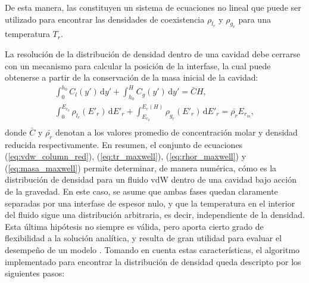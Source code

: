 De esta manera, las  constituyen un sistema de ecuaciones no lineal que puede ser utilizado para encontrar las densidades de coexistencia $\rho_{l_r}$ y $\rho_{g_r}$ para una temperatura $T_r$.

La resoluci\'on de la distribuci\'on de densidad dentro de una cavidad debe cerrarse con un mecanismo para calcular la posici\'on de la interfase, la cual puede obtenerse a partir de la conservaci\'on de la masa inicial de la cavidad:
\begin{equation}
	\begin{gathered}
		\int_{0}^{h_0} C_l(y') \, \mbox{d}y' + \int_{h_0}^{H} C_g(y') \, \mbox{d}y' = \bar{C}H ,\\[3mm]
		\int_{0}^{E_{r_0}} \rho_{l_r} (E'_r) \, \mbox{d}E'_r + \int_{E_{r_0}}^{E_r(H)} \rho_{g_r}(E'_r) \, \mbox{d}E'_r = \bar{\rho_r}E_{r_m}, \\
	\end{gathered}
	\label{eq:masa_maxwell}
\end{equation}
donde $\bar{C}$ y $\bar{\rho_r}$ denotan a los valores promedio de concentraci\'on molar y densidad reducida respectivamente. En resumen, el conjunto de ecuaciones (\ref{eq:vdw_column_red}), (\ref{eq:tr_maxwell}), (\ref{eq:rhor_maxwell}) y (\ref{eq:masa_maxwell}) permite determinar, de manera num\'erica, c\'omo es la distribuci\'on de densidad para un fluido vdW dentro de una cavidad  bajo acci\'on de la gravedad. En este caso, se asume que ambas fases quedan claramente separadas por una interfase de espesor nulo, y que la temperatura en el interior del fluido sigue una distribuci\'on arbitraria, es decir, independiente de la densidad.  Esta \'ultima hip\'otesis no siempre es v\'alida, pero aporta cierto grado de flexibilidad a la soluci\'on anal\'itica, y resulta de gran utilidad para evaluar el desempe\~no de un modelo \pp{}. Tomando en cuenta estas caracter\'isticas, el algoritmo implementado para encontrar la distribuci\'on de densidad queda descripto por los siguientes pasos:

